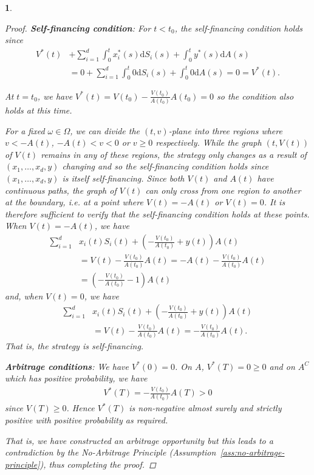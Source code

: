\documentclass[english]{article}
\numberwithin{equation}{section}
\numberwithin{figure}{section}
\theoremstyle{bolddescit}
\theoremstyle{definition}
\theoremstyle{definition}
\theoremstyle{plain}
\newtheorem{lemma}[theorem]{\protect\lemmaname}
\theoremstyle{plain}
\theoremstyle{bolddesc}
\theoremstyle{plain}
\theoremstyle{remark}
\providecommand{\lemmaname}{Lemma}
\begin{document}
\begin{lemma}
\begin{proof}
    \textbf{Self-financing condition}:
      For $t < t_0$, the self-financing condition holds since
      \begin{align*}
      V^*(t) &+ \sum_{i=1}^d \int_0^t x_i^*(s)\mathrm{d}S_i(s) + \int_0^t y^*(s) \mathrm{d}A(s)\\
      &= 0 + \sum_{i=1}^d \int_0^t 0 \mathrm{d}S_i(s) + \int_0^t 0 \mathrm{d}A(s)
      = 0 = V^*(t).
      \end{align*}

      At $t = t_0$, we have $V^*(t) = V(t_0) - \frac{V(t_0)}{A(t_0)} A(t_0) = 0$ so the condition also holds at this time.

      For a fixed $\omega \in \Omega$, we can divide the $(t,v)$-plane into three regions where $v < -A(t)$, $-A(t) < v < 0$ or $v \ge 0$ respectively. While the graph $(t,V(t))$ of $V(t)$ remains in any of these regions, the strategy only changes as a result of $(x_1,\ldots,x_d,y)$ changing and so the self-financing condition holds since $(x_1,\ldots,x_d,y)$ is itself self-financing. Since both $V(t)$ and $A(t)$ have continuous paths, the graph of $V(t)$ can only cross from one region to another at the boundary, i.e. at a point where $V(t) = -A(t)$ or $V(t) = 0$. It is therefore sufficient to verify that the self-financing condition holds at these points. When $V(t) = -A(t)$, we have
      \begin{align*}
        \sum_{i=1}^{d} &x_i(t) S_i(t) + \left(- \frac{V(t_0)}{A(t_0)} + y(t)\right) A(t)\\
        &= V(t) - \frac{V(t_0)}{A(t_0)} A(t) = -A(t) - \frac{V(t_0)}{A(t_0)} A(t)\\
        &= \left(- \frac{V(t_0)}{A(t_0)} - 1\right) A(t)
      \end{align*}
      and, when $V(t) = 0$, we have
      \begin{align*}
        \sum_{i=1}^{d} &x_i(t) S_i(t) + \left(- \frac{V(t_0)}{A(t_0)} + y(t)\right) A(t)\\
        &= V(t) - \frac{V(t_0)}{A(t_0)} A(t) = - \frac{V(t_0)}{A(t_0)} A(t).
      \end{align*}
      That is, the strategy is self-financing.

    \textbf{Arbitrage conditions}: We have $V^*(0) = 0$. On $A$, $V^*(T) = 0 \ge 0$ and on $A^C$ which has positive probability, we have
    \begin{align*}
      V^*(T) = -\frac{V(t_0)}{A(t_0)} A(T) > 0
    \end{align*}
    since $V(T) \ge 0$. Hence $V^*(T)$ is non-negative almost surely and strictly positive with positive probability as required.

    That is, we have constructed an arbitrage opportunity but this leads to a contradiction by the No-Arbitrage Principle (Assumption~\ref{ass:no-arbitrage-principle}), thus completing the proof.
  \end{proof}
\end{lemma}
\end{document}
